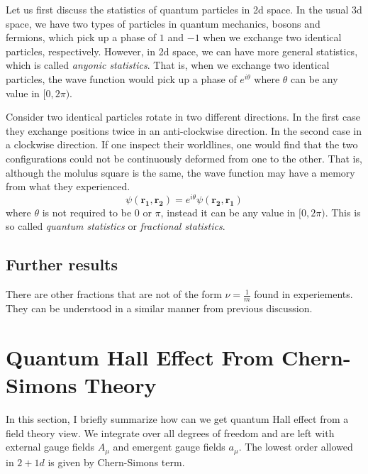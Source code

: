 \documentclass[12pt,a4paper]{article}
\numberwithin{equation}{section}
\begin{document}
Let us first discuss the statistics of quantum particles in 2d space. In the usual 3d space, we have two types of particles in quantum mechanics, bosons and fermions, which pick up a phase of $1$ and $-1$ when we exchange two identical particles, respectively. 
However, in 2d space, we can have more general statistics, which is called \textit{anyonic statistics}. That is, when we exchange two identical particles, the wave function would pick up a phase of $e^{i\theta}$ where $\theta$ can be any value in $[0,2\pi)$.

Consider two identical particles rotate in two different directions. In the first case they exchange positions twice in an anti-clockwise direction. In the second case in a clockwise direction.
If one inspect their worldlines, one would find that the two configurations could not be continuously deformed from one to the other.
That is, although the molulus square is the same, the wave function may have a memory from what they experienced.
\begin{equation}
    \psi(\mathbf{r_1},\mathbf{r_2}) = e^{i\theta}\psi(\mathbf{r_2},\mathbf{r_1})
\end{equation}
where $\theta$ is not required to be $0$ or $\pi$, instead it can be any value in $[0,2\pi)$.
This is so called \textit{quantum statistics} or \textit{fractional statistics}.


\subsection{Further results}
There are other fractions that are not of the form $\nu=\frac{1}{m}$ found in experiements. They can be understood in a similar manner from previous discussion.


\section{Quantum Hall Effect From Chern-Simons Theory}

In this section, I briefly summarize how can we get quantum Hall effect from a field theory view.
We integrate over all degrees of freedom and are left with external gauge fields $A_\mu$ and emergent gauge fields $a_\mu$.
The lowest order allowed in $ 2+1 d$ is given by Chern-Simons term.
\end{document}
